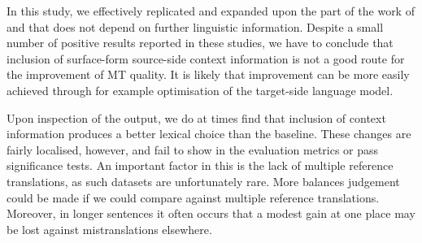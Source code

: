 
In this study, we effectively replicated and expanded upon the part of the work
of \cite{Stroppa+07} and \cite{Rejwanul+11} that does not depend on further
linguistic information. Despite a small number of positive results reported in these
studies, we have to conclude that inclusion of surface-form source-side context
information is not a good route for the improvement of MT quality. It is likely
that improvement can be more easily achieved through for example optimisation
of the target-side language model.

Upon inspection of the output, we do at times find that inclusion of context
information produces a better lexical choice than the baseline. These changes
are fairly localised, however, and fail to show in the evaluation metrics or
pass significance tests. An important factor in this is the lack of multiple
reference translations, as such datasets are unfortunately rare. More balances
judgement could be made if we could compare against multiple reference
translations. Moreover, in longer sentences it often occurs that a modest gain
at one place may be lost against mistranslations elsewhere.

